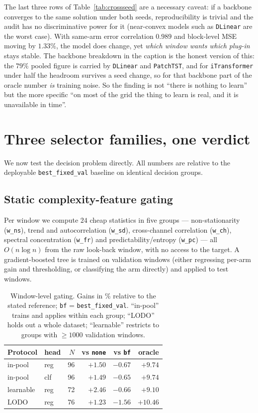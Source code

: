 \documentclass[a4paper,fleqn]{cas-sc}
\newcommand{\arm}[1]{\texttt{#1}}
\begin{document}
The last three rows of Table~\ref{tab:crossseed} are a necessary caveat: if a
backbone converges to the same solution under both seeds, reproducibility is
trivial and the audit has no discriminative power for it (near-convex models such
as \arm{DLinear} are the worst case). With same-arm error correlation $0.989$ and
block-level MSE moving by $1.33\%$, the model does change, yet \emph{which window
wants which plug-in} stays stable. The backbone breakdown in the caption is the
honest version of this: the $79\%$ pooled figure is carried by \arm{DLinear} and
\arm{PatchTST}, and for \arm{iTransformer} under half the headroom survives a
seed change, so for that backbone part of the oracle number \emph{is} training
noise. So the finding is not ``there is nothing to
learn'' but the more specific ``on most of the grid the thing to learn is real,
and it is unavailable in time''.

\section{Three selector families, one verdict}
\label{sec:selectors}


We now test the decision problem directly. All numbers are relative to the
deployable \arm{best\_fixed\_val} baseline on identical decision groups.

\subsection{Static complexity-feature gating}
Per window we compute $24$ cheap statistics in five groups --- non-stationarity
(\texttt{w\_ns}), trend and autocorrelation (\texttt{w\_sd}), cross-channel
correlation (\texttt{w\_ch}), spectral concentration (\texttt{w\_fr}) and
predictability/entropy (\texttt{w\_pc}) --- all $O(n\log n)$ from the raw
look-back window, with no access to the target. A gradient-boosted tree is
trained on validation windows (either regressing per-arm gain and thresholding,
or classifying the arm directly) and applied to test windows.

\begin{table}[t]
\centering\small
\caption{Window-level gating. Gains in \% relative to the stated reference;
\arm{bf} = \arm{best\_fixed\_val}. ``in-pool'' trains and applies within each
group; ``LODO'' holds out a whole dataset; ``learnable'' restricts to groups
with $\geq1000$ validation windows.}
\label{tab:gate}
\begin{tabular}{llrrrr}
\toprule
Protocol & head & $N$ & vs \arm{none} & vs \arm{bf} & oracle \\
\midrule
in-pool     & reg & 96 & $+1.50$ & $\mathbf{-0.67}$ & $+9.74$ \\
in-pool     & clf & 96 & $+1.49$ & $-0.65$ & $+9.74$ \\
learnable   & reg & 72 & $+2.46$ & $-0.66$ & $+9.10$ \\
LODO        & reg & 76 & $+1.23$ & $-1.56$ & $+10.46$ \\
\bottomrule
\end{tabular}
\end{table}
\end{document}
